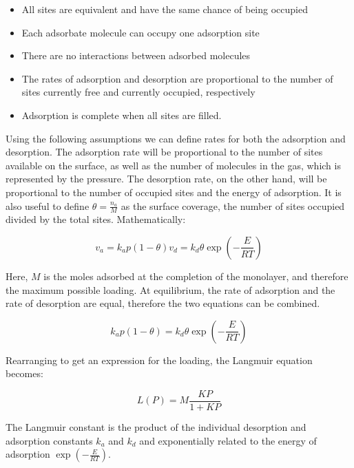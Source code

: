 \begin{itemize}
    
    \item All sites are equivalent and have the same chance of being occupied
    \item Each adsorbate molecule can occupy one adsorption site
    \item There are no interactions between adsorbed molecules
    \item The rates of adsorption and desorption are proportional to the number
    of sites currently free and currently occupied, respectively
    \item Adsorption is complete when all sites are filled.
    
\end{itemize}

Using the following assumptions we can define rates for both the adsorption and
desorption. The adsorption rate will be proportional to the number of sites available
on the surface, as well as the number of molecules in the gas, which is represented by
the pressure. The desorption rate, on the other hand, will be proportional to the
number of occupied sites and the energy of adsorption.
It is also useful to define \(\theta = \frac{n_a}{M}\) as the surface coverage,
the number of sites occupied divided by the total sites. Mathematically:

\begin{equation}
    v_a = k_a p (1 - \theta)
    v_d = k_d \theta \exp{(-\frac{E}{RT})}
\end{equation}

Here, \(M\) is the moles adsorbed at the completion of the monolayer, and therefore
the maximum possible loading. At equilibrium, the rate of adsorption and the rate of
desorption are equal, therefore the two equations can be combined.

\begin{equation}
    k_a p (1 - \theta) = k_d \theta \exp{(-\frac{E}{RT})}
\end{equation}

Rearranging to get an expression for the loading, the Langmuir equation becomes:

\begin{equation}
    L(P) = M\frac{KP}{1+KP}
\end{equation}

The Langmuir constant is the product of the individual desorption and adsorption constants
\(k_a\) and \(k_d\) and exponentially related to the energy of adsorption
\(\exp{(-\frac{E}{RT})}\).

